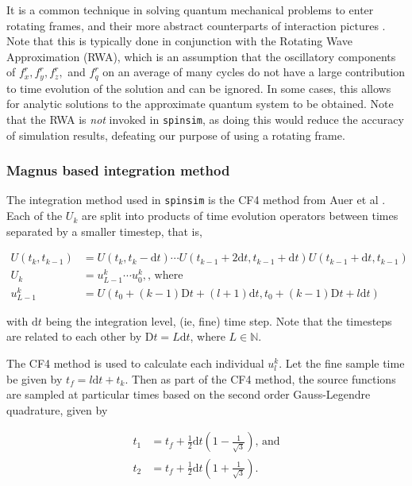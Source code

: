 \documentclass{jors}
\begin{document}
			It is a common technique in solving quantum mechanical problems to enter rotating frames, and their more abstract counterparts of interaction pictures \cite{j_j_sakurai_jun_john_modern_1994}. Note that this is typically done in conjunction with the Rotating Wave Approximation (RWA), which is an assumption that the oscillatory components of \(f^r_x, f^r_y, f^r_z,\) and \(f^r_q\) on an average of many cycles do not have a large contribution to time evolution of the solution and can be ignored. In some cases, this allows for analytic solutions to the approximate quantum system to be obtained. Note that the RWA is \emph{not} invoked in \texttt{spinsim}, as doing this would reduce the accuracy of simulation results, defeating our purpose of using a rotating frame.
			
		\subsubsection*{Magnus based integration method}
			The integration method used in \texttt{spinsim} is the CF4 method from Auer et al \cite{auer_magnus_2018}. Each of the \(U_k\) are split into products of time evolution operators between times separated by a smaller timestep, that is,
			
			\begin{align}
				U(t_k, t_{k-1}) &= U(t_k, t_k - \mathrm{d}t) \cdots U(t_{k-1} + 2\mathrm{d}t, t_{k-1} + \mathrm{d}t) U(t_{k-1} + \mathrm{d}t, t_{k-1})\\
				U_k &= u^k_{L-1} \cdots u^k_0,\textrm{, where}\\
				u^k_{L-1} &= U(t_0 + (k - 1)\mathrm{D}t + (l + 1)\mathrm{d}t, t_0 + (k - 1)\mathrm{D}t + l\mathrm{d}t)
			\end{align}

			with \(\mathrm{d}t\) being the integration level, (ie, fine) time step. Note that the timesteps are related to each other by \(\mathrm{D}t = L\mathrm{d}t\), where \(L\in\mathbb{N}\).

			The CF4 method is used to calculate each individual \(u^k_l\). Let the fine sample time be given by \(t_f = l\mathrm{d}t + t_k\). Then as part of the CF4 method, the source functions are sampled at particular times based on the second order Gauss-Legendre quadrature, given by
			
			\begin{align}
				t_1 &= t_f + \frac12 \mathrm{d}t\left(1 - \frac{1}{\sqrt{3}}\right)\textrm{, and}\\
				t_2 &= t_f + \frac12 \mathrm{d}t\left(1 + \frac{1}{\sqrt{3}}\right).
			\end{align}
\end{document}
